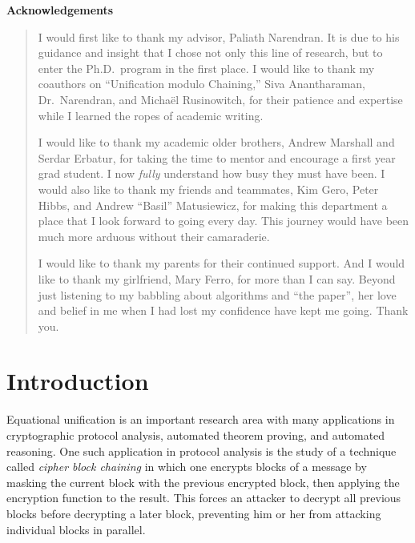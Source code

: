 \documentclass[11pt]{article}
\begin{document}
\clearpage

\begin{center}
    \textbf{Acknowledgements}
\end{center}
\begin{quotation}
I would first like to thank my advisor, Paliath Narendran. It is due to his
guidance and insight that I chose not only this line of research, but to enter
the Ph.D.\ program in the first place.
I would like to thank my coauthors on ``Unification modulo Chaining,'' Siva
Anantharaman, Dr.\ Narendran, and Micha\"{e}l Rusinowitch, for their patience
and expertise while I learned the ropes of academic writing.

I would like to thank my academic older brothers, Andrew Marshall and Serdar
Erbatur, for taking the time to mentor and encourage a first year grad student.
I now \emph{ful{}ly} understand how busy they must have been.
I would also like to thank my friends and teammates, Kim Gero, Peter Hibbs, and
Andrew ``Basil'' Matusiewicz, for making this department a place that I look
forward to going every day. This journey would have been much more arduous
without their camaraderie.

I would like to thank my parents for their continued support.
And I would like to thank my girlfriend, Mary Ferro, for more than I can say.
Beyond just listening to my babbling about algorithms and ``the paper'', her
love and belief in me when I had lost my confidence have kept me going. Thank
you.
\end{quotation}

\cleardoublepage
\tableofcontents

\clearpage
{}

\section{Introduction}\label{section:intro}

Equational unification is an important research area with many applications in
cryptographic protocol analysis, automated theorem proving, and automated
reasoning. One such application in protocol analysis is the study of a
technique called \emph{cipher block chaining} in which one encrypts blocks of a
message by masking the current block with the previous encrypted block, then
applying the encryption function to the result. This forces an attacker to
decrypt all previous blocks before decrypting a later block, preventing him or
her from attacking individual blocks in parallel.
\end{document}
